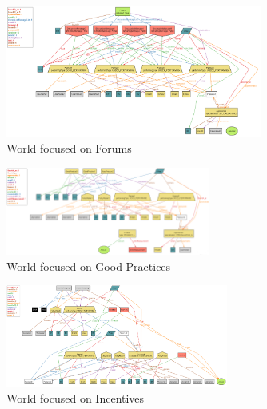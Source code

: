 \begin{figure}[H]
    \centering
    \includegraphics[angle=90, origin=c, width=0.75\textwidth]{Images/Alloy/world3.png}
    \caption{World focused on Forums}
    \label{fig:world3}
\end{figure}

\begin{figure}[H]
    \centering
    \includegraphics[angle=90, origin=c, width=0.6\textwidth]{Images/Alloy/world4.png}
    \caption{World focused on Good Practices}
    \label{fig:world4}
\end{figure}

\begin{figure}[H]
    \centering
    \includegraphics[angle=90, origin=c, width=0.65\textwidth]{Images/Alloy/world5.png}
    \caption{World focused on Incentives}
    \label{fig:world5}
\end{figure}
